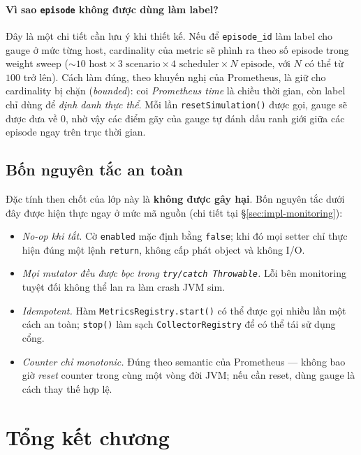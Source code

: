 \paragraph{Vì sao \texttt{episode} không được dùng làm label?}
Đây là một chi tiết cần lưu ý khi thiết kế. Nếu để
\texttt{episode\_id} làm label cho gauge ở mức từng host,
cardinality của metric sẽ phình ra theo số episode trong weight
sweep ($\sim 10\text{ host}\times 3\text{ scenario}\times
4\text{ scheduler} \times N\text{ episode}$, với $N$ có thể từ
$100$ trở lên). Cách làm đúng, theo khuyến nghị của Prometheus, là
giữ cho cardinality bị chặn (\textit{bounded}): coi
\emph{Prometheus time} là chiều thời gian, còn label chỉ dùng để
\emph{định danh thực thể}. Mỗi lần \texttt{resetSimulation()}
được gọi, gauge sẽ được đưa về $0$, nhờ vậy các điểm gãy của
gauge tự đánh dấu ranh giới giữa các episode ngay trên trục thời
gian.

\subsection{Bốn nguyên tắc an toàn}
Đặc tính then chốt của lớp này là \textbf{không được gây hại}. Bốn
nguyên tắc dưới đây được hiện thực ngay ở mức mã nguồn (chi tiết tại
§\ref{sec:impl-monitoring}):

\begin{itemize}
  \item \emph{No-op khi tắt.} Cờ \texttt{enabled} mặc định bằng
        \texttt{false}; khi đó mọi setter chỉ thực hiện đúng một
        lệnh \texttt{return}, không cấp phát object và không I/O.
  \item \emph{Mọi mutator đều được bọc trong
        \texttt{try/catch Throwable}.} Lỗi bên monitoring tuyệt
        đối không thể lan ra làm crash JVM sim.
  \item \emph{Idempotent.} Hàm \texttt{MetricsRegistry.start()}
        có thể được gọi nhiều lần một cách an toàn; \texttt{stop()}
        làm sạch \texttt{CollectorRegistry} để có thể tái sử dụng
        cổng.
  \item \emph{Counter chỉ monotonic.} Đúng theo semantic của
        Prometheus --- không bao giờ \emph{reset} counter trong
        cùng một vòng đời JVM; nếu cần reset, dùng gauge là cách
        thay thế hợp lệ.
\end{itemize}

\section{Tổng kết chương}
\label{sec:ket-luan-c3}

